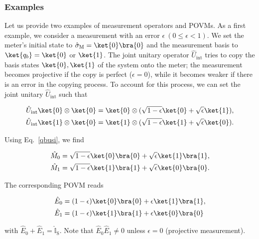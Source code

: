 \documentclass[preprint,pteplogo]{ptephy_v2}%
\numberwithin{equation}{section}
\theoremstyle{definition}
\newcommand{\mr}[1]{\mathrm{#1}}
\newcommand{\mbb}[1]{\mathbb{#1}}
\newcommand{\ketbra}[1]{\ket{#1}\bra{#1}}
\newcommand{\aln}[1]{
\begin{align}
#1
\end{align}
}
\begin{document}
\subsubsection{Examples}
Let us provide two examples of measurement operators and POVMs.
As a first example, we consider a measurement with an error $\epsilon\:(0\leq \epsilon <1)$.
We set the meter's initial state to $\hat{\sigma}_\mr{M}=\ket{0}\bra{0}$ and the measurement basis to $\ket{q_b}=\ket{0}$ or $\ket{1}$.
The joint unitary operator $\hat{U}_\mr{int}$ tries to copy the basis states $\ket{0},\ket{1}$ of the system onto the meter; the measurement becomes projective if the copy is perfect {($\epsilon=0$)}, while it becomes weaker if there is an error in the copying process.
To account for this process, we can set the joint unitary $\hat{U}_\mr{int}$ such that 
\aln{
\begin{split}\hat{U}_\mr{int}\ket{0}\otimes \ket{0}&=\ket{0}\otimes (\sqrt{1-\epsilon}\ket{0}+\sqrt{\epsilon}\ket{1}),\\
\hat{U}_\mr{int}\ket{1}\otimes \ket{0}&=\ket{1}\otimes (\sqrt{1-\epsilon}\ket{1}+\sqrt{\epsilon}\ket{0}).
\end{split}}
Using Eq.~\eqref{qbusi}, we find
\aln{
\begin{split}\hat{M}_0&=\sqrt{1-\epsilon}\ket{0}\bra{0}+\sqrt{\epsilon}\ketbra{1},\\
\hat{M}_1&=\sqrt{1-\epsilon}\ket{1}\bra{1}+\sqrt{\epsilon}\ketbra{0}.
\end{split}}
The corresponding POVM reads
\aln{
\begin{split}\hat{E}_0&=({1-\epsilon})\ket{0}\bra{0}+{\epsilon}\ketbra{1},\\
\hat{E}_1&=({1-\epsilon})\ket{1}\bra{1}+{\epsilon}\ketbra{0}
\end{split}}
with $\hat{E}_0+\hat{E}_1=\hat{\mbb{I}}_\mr{S}$.
Note that $\hat{E}_0\hat{E}_1\neq 0$ unless $\epsilon=0$ (projective measurement).
\end{document}
